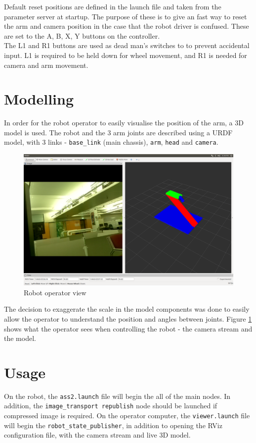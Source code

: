 \documentclass[titlepage,12pt,a4paper]{article}
\begin{document}
\noindent Default reset positions are defined in the launch file and taken from the parameter server at startup. The purpose of these is to give an fast way to reset the arm and camera position in the case that the robot driver is confused. These are set to the A, B, X, Y buttons on the controller. \\

\noindent The L1 and R1 buttons are used as dead man's switches to to prevent accidental input. L1 is required to be held down for wheel movement, and R1 is needed for camera and arm movement.\\

\newpage
\section{Modelling}
In order for the robot operator to easily visualise the position of the arm, a 3D model is used. The robot and the 3 arm joints are described using a URDF model, with 3 links - \texttt{base\_link} (main chassis), \texttt{arm}, \texttt{head} and \texttt{camera}.\\


\begin{figure}
  \centering
    \includegraphics[width=\textwidth]{rviz}
  \caption{Robot operator view}
  \label{fig:rviz}
\end{figure}

\noindent The decision to exaggerate the scale in the model components was done to easily allow the operator to understand the position and angles between joints. Figure \ref{fig:rviz} shows what the operator sees when controlling the robot - the camera stream and the model.

\section{Usage}
On the robot, the \texttt{ass2.launch} file will begin the all of the main nodes. In addition, the \texttt{image\_transport republish} node should be launched if compressed image is required. On the operator computer, the \texttt{viewer.launch} file will begin the \texttt{robot\_state\_publisher}, in addition to opening the RViz configuration file, with the camera stream and live 3D model.
\end{document}
